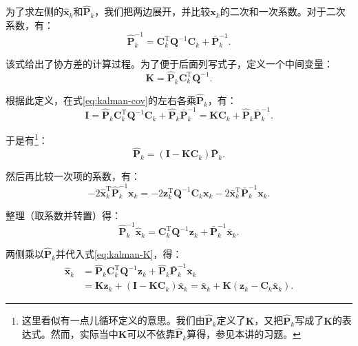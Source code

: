 为了求左侧的$\hat{\bm{x}}_k$和$\bm{\hat{P}}_k$，我们把两边展开，并比较$\bm{x}_k$的二次和一次系数。对于二次系数，有：
\begin{equation}
\label{eq:kalman-cov}
\hat{\bm{P}}_k^{ - 1} = \bm{C}_k^\mathrm{T}{\bm{Q}^{ - 1}}{\bm{C}_k} + \bar {\bm{P}}_k^{ - 1}.
\end{equation}

该式给出了协方差的计算过程。为了便于后面列写式子，定义一个中间变量：
\begin{equation}
\label{eq:kalman-K}
\bm{K} = \bm{\hat{P}}_k \bm{C}_k^\mathrm{T} \bm{Q}^{-1}.
\end{equation}

根据此定义，在式\eqref{eq:kalman-cov}的左右各乘$\bm{\hat{P}}_k$，有：
\begin{equation}
\bm{I} = \bm{\hat{P}}_k \bm{C}_k^\mathrm{T} \bm{Q}^{-1} \bm{C}_k + \bm{\hat{P}}_k \bm{\bar{P}}_k^{-1} = \bm{K} \bm{C}_k + \bm{\hat{P}}_k \bm{\bar{P}}_k^{-1}.
\end{equation}

于是有\footnote{这里看似有一点儿循环定义的意思。我们由$\bm{\hat{P}}_k$定义了$\bm{K}$，又把$\bm{\hat{P}}_k$写成了$\bm{K}$的表达式。然而，实际当中$\bm{K}$可以不依靠$\bm{\hat{P}}_k$算得，参见本讲的习题。}：
\begin{equation}
\bm{\hat{P}}_k = ( \bm{I} - \bm{K} \bm{C}_k ) \bm{\bar{P}}_k.
\end{equation}

然后再比较一次项的系数，有：
\begin{equation}
- 2\hat {\bm{x}}_k^\mathrm{T} \hat{\bm{P}}_k^{ - 1}{\bm{x}_k} =  - 2\bm{z}_k^\mathrm{T} {\bm{Q}^{ - 1}}{\bm{C}_k}{\bm{x}_k} - 2\bm{\bar {x}}_k^\mathrm{T} \bm{\bar {P}}_k^{ - 1}{\bm{x}_k}.
\end{equation}

整理（取系数并转置）得：
\begin{equation}
\hat { \bm{P}}_k^{ - 1}{{\hat{\bm{x}}}_k} = \bm{C}_k^\mathrm{T} {\bm{Q}^{ - 1}}{\bm{z}_k} + \bar{\bm{P}}_k^{ - 1}{{\bm{\bar{x}}}_k}.
\end{equation}

两侧乘以$\bm{\hat{P}}_k$并代入式\eqref{eq:kalman-K}，得：
\begin{align}
{{\bm{\hat {x}}}_k} &= {{\hat {\bm{P}}}_k} \bm{C}_k^\mathrm{T} { \bm{Q}^{ - 1}}{\bm{z}_k} + {{\bm{\hat{ P}}}_k}\bar {\bm{P}}_k^{ - 1}{{\bar {\bm{x}}}_k}\\
&= \bm{K} {\bm{z}_k} + \left( {\bm{I} - \bm{K}{\bm{C}_k}} \right){{\bm{\bar {x}}}_k} = {{\bar {\bm{x}}}_k} + \bm{K} \left( {\bm{z}_k - {\bm{C}_k}{\bm{\bar{x}}_k}} \right).
\end{align}

